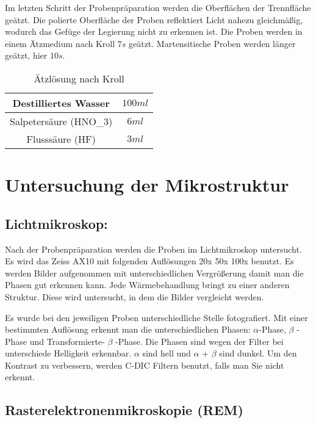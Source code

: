 Im letzten Schritt der Probenpräparation werden die Oberflächen der Trennfläche geätzt. Die polierte Oberfläche der Proben reflektiert Licht nahezu gleichmäßig, wodurch das Gefüge der Legierung nicht zu erkennen ist. 
Die Proben werden in einem Ätzmedium nach Kroll $7s$ geätzt. Martensitische Proben werden länger geätzt, hier $10s$. 

\begin{table}[h]
	\centering
	\begin{tabular}{|c|c|}
		
		\hline 
		Destilliertes Wasser
		& $100ml$
		\\ 
		\hline 
		Salpetersäure (HNO_{3})	& $6ml$
		\\ 
		\hline 
		Flusssäure (HF) & $3ml$
		\\ 
		\hline 
	\end{tabular} 
	\caption{Ätzlösung nach Kroll}
	\label{tab:Ätz_Kroll}
\end{table}


\section{Untersuchung der Mikrostruktur}

\subsection{Lichtmikroskop:}

	Nach der Probenpräparation werden die Proben im Lichtmikroskop untersucht. Es wird das Zeiss AX10 mit folgenden Auflösungen 20x 50x 100x benutzt. Es werden Bilder aufgenommen mit unterschiedlichen Vergrößerung damit man die Phasen gut erkennen kann. Jede Wärmebehandlung bringt zu einer anderen Struktur. Diese wird untersucht, in dem die Bilder vergleicht werden. 
	
	Es wurde bei den jeweiligen Proben unterschiedliche Stelle fotografiert. Mit einer bestimmten Auflösung erkennt man die unterschiedlichen Phasen: $\alpha$-Phase, $\beta$ -Phase und Transformierte- $\beta$ -Phase. Die Phasen sind wegen der Filter bei unterschiede Helligkeit erkennbar. $\alpha$ sind hell und $\alpha$ + $\beta$ sind dunkel. Um den Kontrast zu verbessern, werden C-DIC Filtern benutzt, falls man Sie nicht erkennt.


\subsection{Rasterelektronenmikroskopie (REM)}

